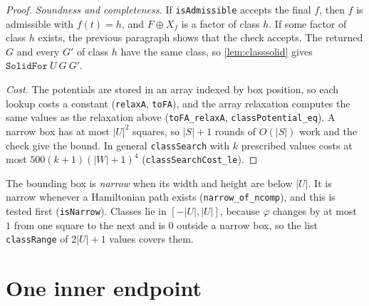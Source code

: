 \documentclass[11pt]{article}
\theoremstyle{plain}
\theoremstyle{definition}
\theoremstyle{remark}
\newcommand{\lean}[1]{\texttt{#1}}
\begin{document}
\begin{proof}
\emph{Soundness and completeness.}
If \lean{isAdmissible} accepts the final $f$, then $f$ is admissible with $f(t)=h$, and
$F\oplus X_f$ is a factor of class $h$.
If some factor of class $h$ exists, the previous paragraph shows that the check accepts.
The returned $G$ and every $G'$ of class $h$ have the same class, so \cref{lem:classsolid} gives
$\lean{SolidFor}\ U\ G\ G'$.

\emph{Cost.}
The potentials are stored in an array indexed by box position, so each lookup costs a constant
(\lean{relaxA}, \lean{toFA}), and the array relaxation computes the same values as the relaxation
above (\lean{toFA\_relaxA}, \lean{classPotential\_eq}).
A narrow box has at most $|U|^2$ squares, so $|S|+1$ rounds of $O(|S|)$ work and the check give
the bound.
In general \lean{classSearch} with $k$ prescribed values costs at most $500(k+1)(|W|+1)^4$
(\lean{classSearchCost\_le}).
\end{proof}

The bounding box is \emph{narrow} when its width and height are below $|U|$.
It is narrow whenever a Hamiltonian path exists (\lean{narrow\_of\_ncomp}), and this is
tested first (\lean{isNarrow}).
Classes lie in $[-|U|,|U|]$, because $\varphi$ changes by at most $1$ from one square to the next and
is $0$ outside a narrow box, so the list \lean{classRange} of $2|U|+1$ values covers them.

\section{One inner endpoint}
\label{sec:one}
\end{document}
